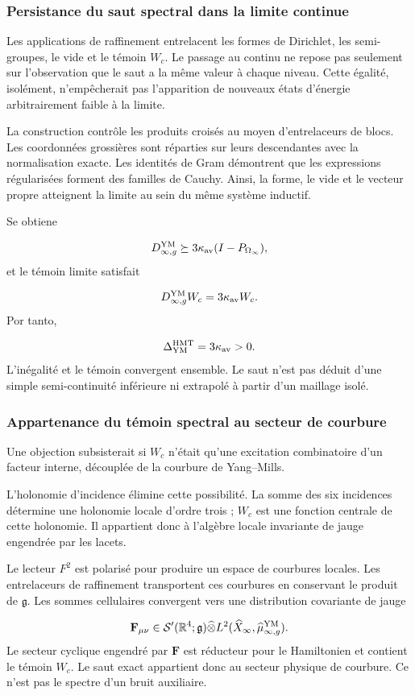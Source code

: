 \subsubsection{Persistance du saut spectral dans la limite continue}
Les applications de raffinement entrelacent les formes de Dirichlet, les semi-groupes, le vide et le témoin \(W_c\). Le passage au continu ne repose pas seulement sur l’observation que le saut a la même valeur à chaque niveau. Cette égalité, isolément, n’empêcherait pas l’apparition de nouveaux états d’énergie arbitrairement faible à la limite.\par
La construction contrôle les produits croisés au moyen d’entrelaceurs de blocs. Les coordonnées grossières sont réparties sur leurs descendantes avec la normalisation exacte. Les identités de Gram démontrent que les expressions régularisées forment des familles de Cauchy. Ainsi, la forme, le vide et le vecteur propre atteignent la limite au sein du même système inductif.\par
Se obtiene\par
\[
D_{\infty,g}^{\rm YM}
\succeq
3\kappa_{\rm av}(I-P_{\Omega_\infty}),
\]
et le témoin limite satisfait\par
\[
D_{\infty,g}^{\rm YM}W_c
=
3\kappa_{\rm av}W_c.
\]
Por tanto,\par
\[
\Delta_{\rm YM}^{\rm HMT}
=
3\kappa_{\rm av}>0.
\]
L’inégalité et le témoin convergent ensemble. Le saut n’est pas déduit d’une simple semi-continuité inférieure ni extrapolé à partir d’un maillage isolé.\par
{}
\subsubsection{Appartenance du témoin spectral au secteur de courbure}
Une objection subsisterait si \(W_c\) n’était qu’une excitation combinatoire d’un facteur interne, découplée de la courbure de Yang–Mills.\par
L’holonomie d’incidence élimine cette possibilité. La somme des six incidences détermine une holonomie locale d’ordre trois ; \(W_c\) est une fonction centrale de cette holonomie. Il appartient donc à l’algèbre locale invariante de jauge engendrée par les lacets.\par
Le lecteur \(F^2\) est polarisé pour produire un espace de courbures locales. Les entrelaceurs de raffinement transportent ces courbures en conservant le produit de \(\mathfrak g\). Les sommes cellulaires convergent vers une distribution covariante de jauge\par
\[
\mathbf F_{\mu\nu}
\in
\mathcal S'(\mathbb R^4;\mathfrak g)
\widehat\otimes
L^2(\widehat X_\infty,\widehat\mu_{\infty,g}^{\rm YM}).
\]
Le secteur cyclique engendré par \(\mathbf F\) est réducteur pour le Hamiltonien et contient le témoin \(W_c\). Le saut exact appartient donc au secteur physique de courbure. Ce n’est pas le spectre d’un bruit auxiliaire.\par
{}

